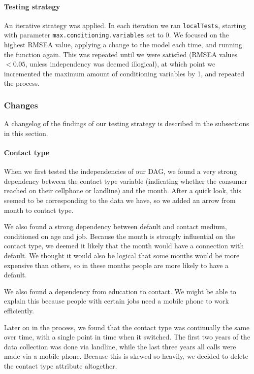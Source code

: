 \documentclass[11pt,]{article}
\let\oldparagraph\paragraph
\renewcommand{\paragraph}[1]{\oldparagraph{#1}\mbox{}}
\begin{document}
\begin{multicols}{2}
\hypertarget{testing-strategy}{%
\paragraph{Testing strategy}\label{testing-strategy}}

An iterative strategy was applied. In each iteration we ran
\texttt{localTests}, starting with parameter
\texttt{max.conditioning.variables} set to 0. We focused on the highest
RMSEA value, applying a change to the model each time, and running the
function again. This was repeated until we were satisfied (RMSEA values
\(<0.05\), unless independency was deemed illogical), at which point we
incremented the maximum amount of conditioning variables by 1, and
repeated the process.

\hypertarget{changes}{%
\subsubsection{Changes}\label{changes}}

A changelog of the findings of our testing strategy is described in the
subsections in this section.

\hypertarget{contact-type}{%
\paragraph{Contact type}\label{contact-type}}

When we first tested the independencies of our DAG, we found a very
strong dependency between the contact type variable (indicating whether
the consumer reached on their cellphone or landline) and the month.
After a quick look, this seemed to be corresponding to the data we have,
so we added an arrow from month to contact type.

We also found a strong dependency between default and contact medium,
conditioned on age and job. Because the month is strongly influential on
the contact type, we deemed it likely that the month would have a
connection with default. We thought it would also be logical that some
months would be more expensive than others, so in these months people
are more likely to have a default.

We also found a dependency from education to contact. We might be able
to explain this because people with certain jobs need a mobile phone to
work efficiently.

Later on in the process, we found that the contact type was continually
the same over time, with a single point in time when it switched. The
first two years of the data collection was done via landline, while the
last three years all calls were made via a mobile phone. Because this is
skewed so heavily, we decided to delete the contact type attribute
altogether.


\end{multicols}
\end{document}
